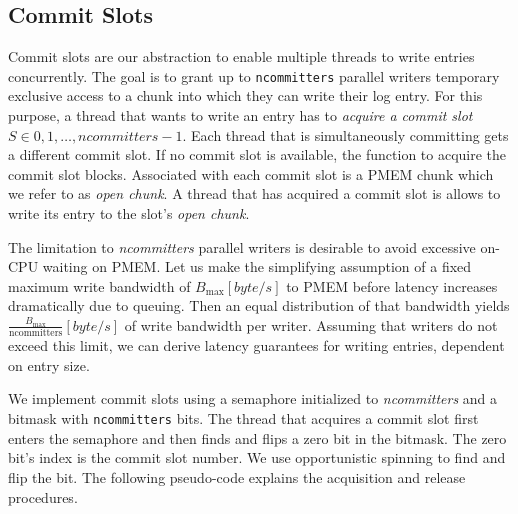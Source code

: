 \documentclass[12pt,a4paper,twoside]{book}
\begin{document}
\subsection{Commit Slots}\label{di:prb:write:chunksel}
Commit slots are our abstraction to enable multiple threads to write entries concurrently.
The goal is to grant up to \lstinline{ncommitters} parallel writers temporary exclusive access to a chunk into which they can write their log entry.
For this purpose, a thread that wants to write an entry has to \textit{acquire a commit slot}~\mbox{$S \in {0, 1, \dots, ncommitters-1}$}.
Each thread that is simultaneously committing gets a different commit slot.
If no commit slot is available, the function to acquire the commit slot blocks.
Associated with each commit slot is a PMEM chunk which we refer to as \textit{open chunk}.
A thread that has acquired a commit slot is allows to write its entry to the slot's \textit{open chunk}.

The limitation to \textit{ncommitters} parallel writers is desirable to avoid excessive on-CPU waiting on PMEM.
Let us make the simplifying assumption of a fixed maximum write bandwidth of $B_\text{max} [byte/s]$ to PMEM before latency increases dramatically due to queuing.
Then an equal distribution of that bandwidth yields $\frac{B_\text{max}}{\text{ncommitters}} [byte/s]$ of write bandwidth per writer.
Assuming that writers do not exceed this limit, we can derive latency guarantees for writing entries, dependent on entry size.

We implement commit slots using a semaphore initialized to \textit{ncommitters} and a bitmask with \lstinline{ncommitters} bits.
The thread that acquires a commit slot first enters the semaphore and then finds and flips a zero bit in the bitmask.
The zero bit's index is the commit slot number.
We use opportunistic spinning to find and flip the bit.
The following pseudo-code explains the acquisition and release procedures.
\end{document}
